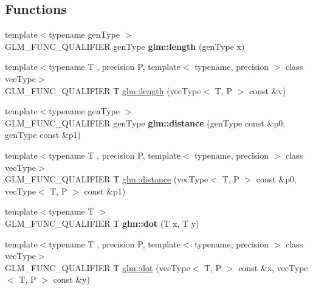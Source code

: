 \subsection*{Functions}
\begin{DoxyCompactItemize}
\item 
\mbox{\label{func__geometric_8inl_abcd8538aa95a8963803ec42c2fd654cd}} 
{\footnotesize template$<$typename gen\+Type $>$ }\\G\+L\+M\+\_\+\+F\+U\+N\+C\+\_\+\+Q\+U\+A\+L\+I\+F\+I\+ER gen\+Type {\bfseries glm\+::length} (gen\+Type x)
\item 
{\footnotesize template$<$typename T , precision P, template$<$ typename, precision $>$ class vec\+Type$>$ }\\G\+L\+M\+\_\+\+F\+U\+N\+C\+\_\+\+Q\+U\+A\+L\+I\+F\+I\+ER T \hyperlink{group__core__func__geometric_ga18d45e3d4c7705e67ccfabd99e521604}{glm\+::length} (vec\+Type$<$ T, P $>$ const \&v)
\item 
\mbox{\label{func__geometric_8inl_aa7275be4cec4bfcf1c4a7add8f3ee7f4}} 
{\footnotesize template$<$typename gen\+Type $>$ }\\G\+L\+M\+\_\+\+F\+U\+N\+C\+\_\+\+Q\+U\+A\+L\+I\+F\+I\+ER gen\+Type {\bfseries glm\+::distance} (gen\+Type const \&p0, gen\+Type const \&p1)
\item 
{\footnotesize template$<$typename T , precision P, template$<$ typename, precision $>$ class vec\+Type$>$ }\\G\+L\+M\+\_\+\+F\+U\+N\+C\+\_\+\+Q\+U\+A\+L\+I\+F\+I\+ER T \hyperlink{group__core__func__geometric_ga7ca317dde0d7e94d920153554d4a02a8}{glm\+::distance} (vec\+Type$<$ T, P $>$ const \&p0, vec\+Type$<$ T, P $>$ const \&p1)
\item 
\mbox{\label{func__geometric_8inl_a40370edb74dec9048258c063b9c091c9}} 
{\footnotesize template$<$typename T $>$ }\\G\+L\+M\+\_\+\+F\+U\+N\+C\+\_\+\+Q\+U\+A\+L\+I\+F\+I\+ER T {\bfseries glm\+::dot} (T x, T y)
\item 
{\footnotesize template$<$typename T , precision P, template$<$ typename, precision $>$ class vec\+Type$>$ }\\G\+L\+M\+\_\+\+F\+U\+N\+C\+\_\+\+Q\+U\+A\+L\+I\+F\+I\+ER T \hyperlink{group__core__func__geometric_ga7dada304da2ba7dd3376ab4f178c3f6b}{glm\+::dot} (vec\+Type$<$ T, P $>$ const \&x, vec\+Type$<$ T, P $>$ const \&y)

\end{DoxyCompactItemize}
